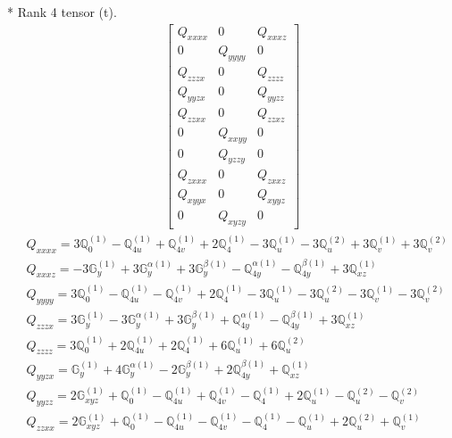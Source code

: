 \documentclass[fleqn,8pt,landscape]{jsarticle}
\begin{document}
* Rank 4 tensor (t).
\begin{align*}
\begin{bmatrix} Q_{xxxx} & 0 & Q_{xxxz} \\ 0 & Q_{yyyy} & 0 \\ Q_{zzzx} & 0 & Q_{zzzz} \\ Q_{yyzx} & 0 & Q_{yyzz} \\ Q_{zzxx} & 0 & Q_{zzxz} \\ 0 & Q_{xxyy} & 0 \\ 0 & Q_{yzzy} & 0 \\ Q_{zxxx} & 0 & Q_{zxxz} \\ Q_{xyyx} & 0 & Q_{xyyz} \\ 0 & Q_{xyzy} & 0 \end{bmatrix}
\end{align*}
\begin{align*}
& Q_{xxxx} = 3 \mathbb{Q}_{0}^{(1)} - \mathbb{Q}_{4u}^{(1)} + \mathbb{Q}_{4v}^{(1)} + 2 \mathbb{Q}_{4}^{(1)} - 3 \mathbb{Q}_{u}^{(1)} - 3 \mathbb{Q}_{u}^{(2)} + 3 \mathbb{Q}_{v}^{(1)} + 3 \mathbb{Q}_{v}^{(2)} \\
& Q_{xxxz} = - 3 \mathbb{G}_{y}^{(1)} + 3 \mathbb{G}_{y}^{\alpha(1)} + 3 \mathbb{G}_{y}^{\beta(1)} - \mathbb{Q}_{4y}^{\alpha(1)} - \mathbb{Q}_{4y}^{\beta(1)} + 3 \mathbb{Q}_{xz}^{(1)} \\
& Q_{yyyy} = 3 \mathbb{Q}_{0}^{(1)} - \mathbb{Q}_{4u}^{(1)} - \mathbb{Q}_{4v}^{(1)} + 2 \mathbb{Q}_{4}^{(1)} - 3 \mathbb{Q}_{u}^{(1)} - 3 \mathbb{Q}_{u}^{(2)} - 3 \mathbb{Q}_{v}^{(1)} - 3 \mathbb{Q}_{v}^{(2)} \\
& Q_{zzzx} = 3 \mathbb{G}_{y}^{(1)} - 3 \mathbb{G}_{y}^{\alpha(1)} + 3 \mathbb{G}_{y}^{\beta(1)} + \mathbb{Q}_{4y}^{\alpha(1)} - \mathbb{Q}_{4y}^{\beta(1)} + 3 \mathbb{Q}_{xz}^{(1)} \\
& Q_{zzzz} = 3 \mathbb{Q}_{0}^{(1)} + 2 \mathbb{Q}_{4u}^{(1)} + 2 \mathbb{Q}_{4}^{(1)} + 6 \mathbb{Q}_{u}^{(1)} + 6 \mathbb{Q}_{u}^{(2)} \\
& Q_{yyzx} = \mathbb{G}_{y}^{(1)} + 4 \mathbb{G}_{y}^{\alpha(1)} - 2 \mathbb{G}_{y}^{\beta(1)} + 2 \mathbb{Q}_{4y}^{\beta(1)} + \mathbb{Q}_{xz}^{(1)} \\
& Q_{yyzz} = 2 \mathbb{G}_{xyz}^{(1)} + \mathbb{Q}_{0}^{(1)} - \mathbb{Q}_{4u}^{(1)} + \mathbb{Q}_{4v}^{(1)} - \mathbb{Q}_{4}^{(1)} + 2 \mathbb{Q}_{u}^{(1)} - \mathbb{Q}_{u}^{(2)} - \mathbb{Q}_{v}^{(2)} \\
& Q_{zzxx} = 2 \mathbb{G}_{xyz}^{(1)} + \mathbb{Q}_{0}^{(1)} - \mathbb{Q}_{4u}^{(1)} - \mathbb{Q}_{4v}^{(1)} - \mathbb{Q}_{4}^{(1)} - \mathbb{Q}_{u}^{(1)} + 2 \mathbb{Q}_{u}^{(2)} + \mathbb{Q}_{v}^{(1)} \\

\end{align*}
\end{document}
